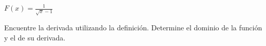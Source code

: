 \item $F(x) = \frac{1}{\sqrt{x} - 1}$
\par
Encuentre la derivada utilizando la definición. Determine el dominio de la función y el de su derivada.
